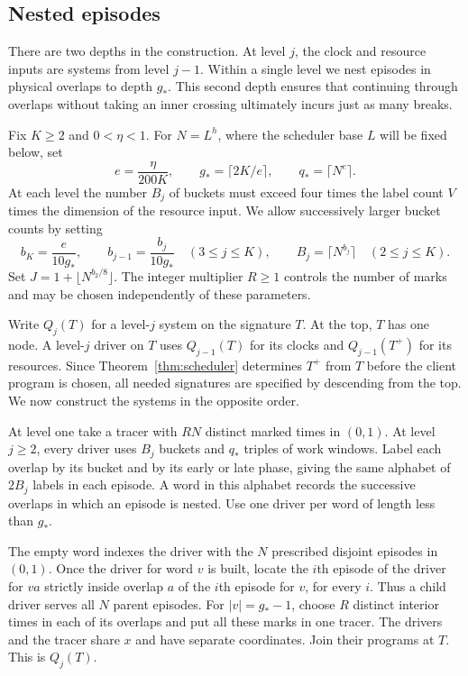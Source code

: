 

\subsection{Nested episodes}
There are two depths in the construction. At level $j$, the clock and
resource inputs are systems from level $j-1$. Within a single level we
nest episodes in physical overlaps to depth $g_*$. This second depth
ensures that continuing through overlaps without taking an inner crossing
ultimately incurs just as many breaks.

Fix $K\ge2$ and $0<\eta<1$. For $N=L^h$, where the scheduler base $L$
will be fixed below, set
\[
  e=\frac{\eta}{200K},\qquad
  g_*=\lceil 2K/e\rceil,\qquad q_*=\lceil N^e\rceil .
\]
At each level the number $B_j$ of buckets must exceed four times the
label count $V$ times the dimension of the resource input. We allow
successively larger bucket counts by setting
\[
 b_K=\frac{e}{10g_*},\qquad b_{j-1}=\frac{b_j}{10g_*}\quad(3\le j\le K),
 \qquad B_j=\lceil N^{b_j}\rceil\quad(2\le j\le K).
\]
Set $J=1+\lfloor N^{b_2/8}\rfloor$. The integer multiplier $R\ge1$ controls
the number of marks and may be chosen independently of these parameters.

Write $Q_j(T)$ for a level-$j$ system on the signature $T$. At the top,
$T$ has one node. A level-$j$ driver on $T$ uses $Q_{j-1}(T)$ for its
clocks and $Q_{j-1}(T^+)$ for its resources. Since
Theorem~\ref{thm:scheduler} determines $T^+$ from $T$ before the client
program is chosen, all needed signatures are specified by descending
from the top. We now construct the systems in the opposite order.

At level one take a tracer with $RN$ distinct marked times in $(0,1)$.
At level $j\ge2$, every driver uses $B_j$ buckets and $q_*$ triples of
work windows. Label each overlap by its bucket and by its early or late
phase, giving the same alphabet of $2B_j$ labels in each episode. A word
in this alphabet records the successive overlaps in which an episode
is nested. Use one driver per word of length less than $g_*$.

The empty word indexes the driver with the $N$ prescribed disjoint
episodes in $(0,1)$. Once the driver for word $v$ is built, locate the
$i$th episode of the driver for $va$ strictly inside overlap $a$ of
the $i$th episode for $v$, for every $i$. Thus a child driver serves
all $N$ parent episodes. For $|v|=g_*-1$, choose $R$ distinct interior
times in each of its overlaps and put all these marks in one tracer.
The drivers and the tracer share $x$ and have separate coordinates.
Join their programs at $T$. This is $Q_j(T)$.

